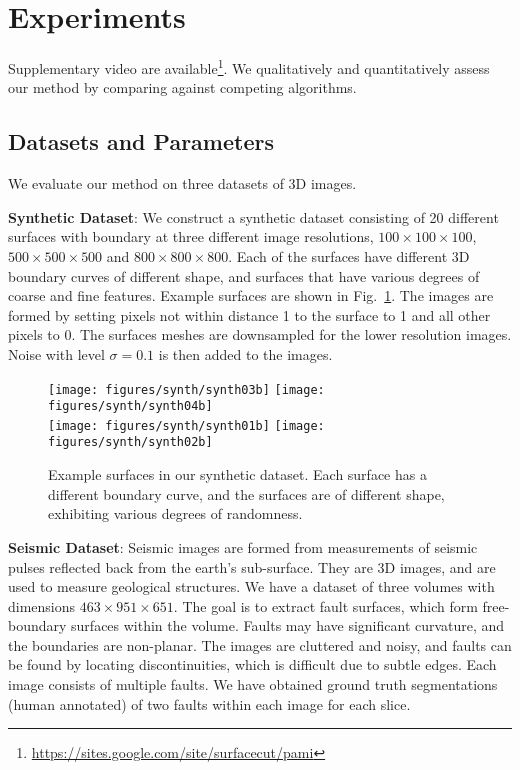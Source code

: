 \documentclass[10pt,journal,compsoc]{IEEEtran}
\begin{document}
\section{Experiments}

\label{sec:expts}

Supplementary video are
available\footnote{\url{https://sites.google.com/site/surfacecut/pami}}. We
qualitatively and quantitatively assess our method by comparing
against competing algorithms.

\subsection{Datasets and Parameters}
We evaluate our method on three datasets of 3D images.

{\bf Synthetic Dataset}: We construct a synthetic dataset consisting
of 20 different surfaces with boundary at three different image
resolutions, $100\times 100\times 100$, $500\times 500\times 500$ and
$800\times 800\times 800$. Each of the surfaces have different 3D
boundary curves of different shape, and surfaces that have various
degrees of coarse and fine features. Example surfaces are shown in
Fig.~\ref{fig:synthetic_surfaces}. The images are formed by setting
pixels not within distance 1 to the surface to 1 and all other pixels
to 0. The surfaces meshes are downsampled for the lower resolution
images. Noise with level $\sigma=0.1$ is then added to the images.

\def\fHeightSynth{1.3in}
\begin{figure}
  \centering
  \texttt{[image: figures/synth/synth03b]}
  \texttt{[image: figures/synth/synth04b]}\\\vspace{1mm}%
  \texttt{[image: figures/synth/synth01b]}
  \texttt{[image: figures/synth/synth02b]}
  \caption{Example surfaces in our synthetic dataset. Each surface has
    a different boundary curve, and the surfaces are of different
    shape, exhibiting various degrees of randomness.}
  \label{fig:synthetic_surfaces}
\end{figure}

{\bf Seismic Dataset}: Seismic images are formed from measurements of
seismic pulses reflected back from the earth's sub-surface. They are
3D images, and are used to measure geological structures. We have a
dataset of three volumes with dimensions $463\times 951 \times
651$. The goal is to extract fault surfaces, which form free-boundary
surfaces within the volume. Faults may have significant curvature, and
the boundaries are non-planar. The images are cluttered and noisy, and
faults can be found by locating discontinuities, which is difficult
due to subtle edges. Each image consists of multiple faults. We have
obtained ground truth segmentations (human annotated) of two faults
within each image for each slice.
\end{document}
